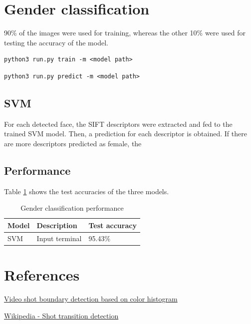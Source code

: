 \documentclass{article}
\begin{document}
\section{Gender classification}
90\% of the images were used for training, whereas the other 10\% were used for testing the accuracy of the model.

\begin{verbatim}
python3 run.py train -m <model path>
\end{verbatim}

\begin{verbatim}
python3 run.py predict -m <model path>
\end{verbatim}

\subsection*{SVM}
For each detected face, the SIFT descriptors were extracted and fed to the trained SVM model. Then, a prediction for each descriptor is obtained. If there are more descriptors predicted as female, the 

\subsection*{Performance}
Table \ref{tab:gender_classification} shows the test accuracies of the three models. 

\begin{table}
 \caption{Gender classification performance}
  \centering
  \begin{tabular}{lll}
    \toprule
    Model		& Description		& Test accuracy \\
    \midrule
    SVM			& Input terminal	& 95.43\%     \\
    \bottomrule
  \end{tabular}
  \label{tab:gender_classification}
\end{table}

\section{References}
\href{https://www-nlpir.nist.gov/projects/tvpubs/tvpapers03/ramonlull.paper.pdf}{Video shot boundary detection based on color histogram}

\href{https://en.wikipedia.org/wiki/Shot_transition_detection}{Wikipedia - Shot transition detection}
\end{document}
